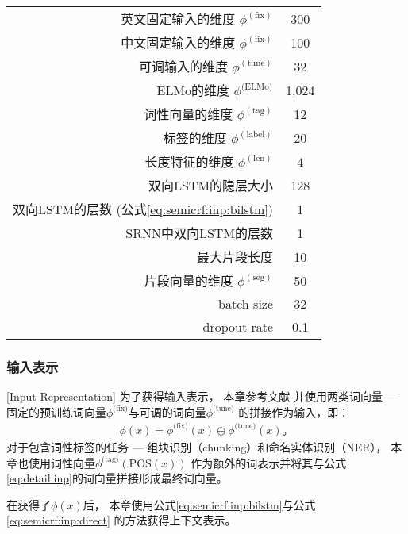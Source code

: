 \begin{table}[t]
	\vspace{0.5em}\centering\wuhao
	\begin{tabular}{r|c}
		\toprule[1.5pt]
		英文固定输入的维度 $\phi^{(\text{fix})}$ & 300 \\
		中文固定输入的维度 $\phi^{(\text{fix})}$ & 100 \\
		可调输入的维度 $\phi^{(\text{tune})}$ & 32 \\
		ELMo的维度 $\phi^{\text{(ELMo)}}$ & 1,024 \\
		词性向量的维度 $\phi^{(\text{tag})}$ & 12 \\
		标签的维度 $\phi^{(\text{label})}$ & 20 \\
		长度特征的维度 $\phi^{(\text{len})}$ & 4 \\
		双向LSTM的隐层大小 & 128 \\
		双向LSTM的层数 (公式\ref{eq:semicrf:inp:bilstm}) & 1 \\
		SRNN中双向LSTM的层数 & 1 \\
		最大片段长度 & 10 \\
		片段向量的维度 $\phi^{(\text{seg})}$ & 50 \\
		batch size & 32 \\
		dropout rate & 0.1 \\
		\bottomrule[1.5pt]
	\end{tabular}
\end{table}

\subsubsection{输入表示}[Input Representation]
为了获得输入表示，
本章参考文献
并使用两类词向量 --- 
固定的预训练词向量$\phi^{\text{(fix)}}$与可调的词向量$\phi^{\text{(tune)}}$
的拼接作为输入，即：
\begin{align}\label{eq:detail:inp}
\phi(x) = \phi^{\text{(fix)}}(x) \oplus \phi^{\text{(tune)}}(x)\text{。}
\end{align}
对于包含词性标签的任务 --- 组块识别（chunking）和命名实体识别（NER），
本章也使用词性向量$\phi^{\text{(tag)}}(\text{POS}(x))$
作为额外的词表示并将其与公式\ref{eq:detail:inp}的词向量拼接形成最终词向量。

在获得了$\phi(x)$后，
本章使用公式\ref{eq:semicrf:inp:bilstm}与公式\ref{eq:semicrf:inp:direct}
的方法获得上下文表示。

